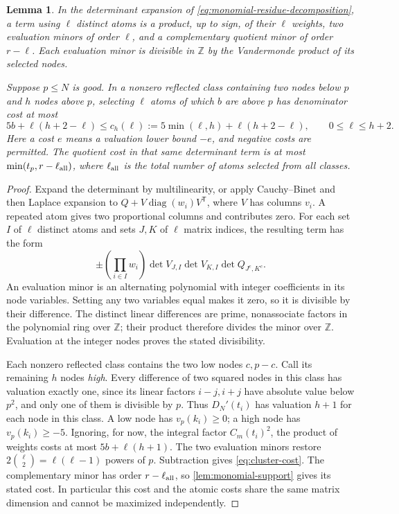 \documentclass[11pt,letterpaper]{article}
\newtheorem{lemma}[lemma]{Lemma}
\theoremstyle{definition}
\newcommand{\Z}{\mathbb Z}
\begin{document}
\begin{lemma}\label{lem:mixed-minors}
In the determinant expansion of \eqref{eq:monomial-residue-decomposition},
a term using $\ell$ distinct atoms is a product, up to sign, of
their $\ell$ weights, two evaluation minors of order $\ell$, and
a complementary quotient minor of order $r-\ell$.
Each evaluation minor is divisible in $\Z$ by the Vandermonde
product of its selected nodes.

Suppose $p\le N$ is good. In a nonzero reflected class containing
two nodes below $p$ and $h$ nodes above $p$, selecting $\ell$
atoms of which $b$ are above $p$ has denominator cost at most
\begin{equation}\label{eq:cluster-cost}
 5b+\ell(h+2-\ell)
 \le c_h(\ell):=5\min(\ell,h)+\ell(h+2-\ell),
 \qquad 0\le\ell\le h+2.
\end{equation}
Here a cost $e$ means a valuation lower bound $-e$, and negative
costs are permitted. The quotient cost in that same determinant
term is at most $\min(t_p,r-\ell_{\rm all})$, where
$\ell_{\rm all}$ is the total number of atoms selected from all classes.
\end{lemma}
\begin{proof}
Expand the determinant by multilinearity, or apply Cauchy--Binet and
then Laplace expansion to $Q+V\operatorname{diag}(w_i)V^{\mathsf T}$,
where $V$ has columns $v_i$. A repeated atom gives two proportional
columns and contributes zero. For each set $I$ of $\ell$ distinct
atoms and sets $J,K$ of $\ell$ matrix indices, the resulting term
has the form
\[
 \pm\left(\prod_{i\in I}w_i\right)
 \det V_{J,I}\det V_{K,I}\det Q_{J^c,K^c}.
\]
An evaluation minor is an alternating polynomial with integer
coefficients in its node variables. Setting any two variables equal
makes it zero, so it is divisible by their difference. The distinct
linear differences are prime, nonassociate factors in the polynomial
ring over $\Z$; their product therefore divides the minor over $\Z$.
Evaluation at the integer nodes proves the stated divisibility.

Each nonzero reflected class contains the two low nodes $c,p-c$.
Call its remaining $h$ nodes \emph{high}. Every difference of two
squared nodes in this class has valuation exactly one, since its
linear factors $i-j,i+j$ have absolute value below $p^2$, and only
one of them is divisible by $p$. Thus $D_N'(t_i)$ has valuation
$h+1$ for each node in this class. A low node has $v_p(k_i)\ge0$;
a high node has $v_p(k_i)\ge-5$. Ignoring, for now, the integral
factor $C_m(t_i)^2$, the product of weights costs at most
$5b+\ell(h+1)$. The two evaluation minors restore
$2\binom\ell2=\ell(\ell-1)$ powers of $p$. Subtraction gives
\eqref{eq:cluster-cost}. The complementary minor has order
$r-\ell_{\rm all}$, so \cref{lem:monomial-support} gives its stated
cost. In particular this cost and the atomic costs share the same
matrix dimension and cannot be maximized independently.
\end{proof}
\end{document}
